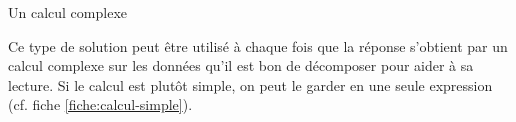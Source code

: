 \begin{Fiche}{Un calcul complexe}

	Ce type de solution peut être utilisé à chaque fois
	que la réponse s'obtient par un calcul complexe sur les données
	qu'il est bon de décomposer pour aider à sa lecture.
	Si le calcul est plutôt simple, 
	on peut le garder en une seule expression
	(cf. fiche \vref{fiche:calcul-simple}).
	
\end{Fiche}
